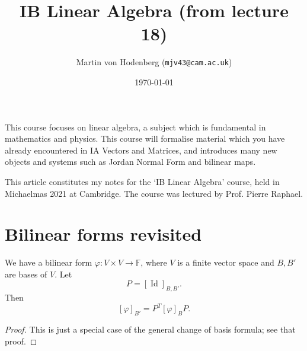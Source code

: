 \documentclass[a4paper]{scrartcl}
\title{IB Linear Algebra (from lecture 18)}
\author{Martin von Hodenberg (\texttt{mjv43@cam.ac.uk})}
\date{\today}
\begin{document}
\maketitle

This course focuses on linear algebra, a subject which is fundamental in mathematics and physics. This course will formalise material which you have already encountered in IA Vectors and Matrices, and introduces many new objects and systems such as Jordan Normal Form and bilinear maps.

This article constitutes my notes for the `IB Linear Algebra' course, held in Michaelmas 2021 at Cambridge. The course was lectured by Prof. Pierre Raphael.


\tableofcontents
\newpage 

\section{Bilinear forms revisited}
\begin{lemma}
    We have a bilinear form $\varphi: V \times V \rightarrow \mathbb{F}$, where $V$ is a finite vector space and $B, B'$ are bases of $V$. Let 
    \[P=[\operatorname{Id}]_{B,B'}.\]
     Then 
    \[[\varphi]_{B'}=P^T [\varphi]_B P.\]
\end{lemma}
\begin{proof}
     This is just a special case of the general change of basis formula; see that proof.
\end{proof}
\end{document}
